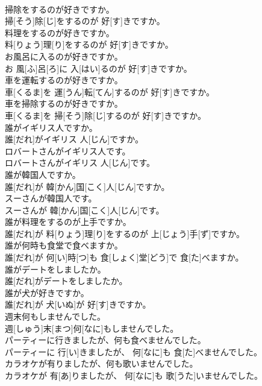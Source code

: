 \documentclass[8pt]{extreport}
\begin{document}
\begin{CJK}{UTF8}{min}
\\	掃除をするのが好きですか。	
\\	掃[そう]除[じ]をするのが 好[す]きですか。
\\	料理をするのが好きですか。	
\\	料[りょう]理[り]をするのが 好[す]きですか。
\\	お風呂に入るのが好きですか。	
\\	お 風[ふ]呂[ろ]に 入[はい]るのが 好[す]きですか。
\\	車を運転するのが好きですか。	
\\	車[くるま]を 運[うん]転[てん]するのが 好[す]きですか。
\\	車を掃除するのが好きですか。	
\\	車[くるま]を 掃[そう]除[じ]するのが 好[す]きですか。
\\	誰がイギリス人ですか。	
\\	誰[だれ]がイギリス 人[じん]ですか。
\\	ロバートさんがイギリス人です。	
\\	ロバートさんがイギリス 人[じん]です。
\\	誰が韓国人ですか。	
\\	誰[だれ]が 韓[かん]国[こく]人[じん]ですか。
\\	スーさんが韓国人です。	
\\	スーさんが 韓[かん]国[こく]人[じん]です。
\\	誰が料理をするのが上手ですか。	
\\	誰[だれ]が 料[りょう]理[り]をするのが 上[じょう]手[ず]ですか。
\\	誰が何時も食堂で食べますか。	
\\	誰[だれ]が 何[い]時[つ]も 食[しょく]堂[どう]で 食[た]べますか。
\\	誰がデートをしましたか。	
\\	誰[だれ]がデートをしましたか。
\\	誰が犬が好きですか。	
\\	誰[だれ]が 犬[いぬ]が 好[す]きですか。
\\	週末何もしませんでした。	
\\	週[しゅう]末[まつ]何[なに]もしませんでした。
\\	パーティーに行きましたが、何も食べませんでした。	
\\	パーティーに 行[い]きましたが、 何[なに]も 食[た]べませんでした。
\\	カラオケが有りましたが、何も歌いませんでした。	
\\	カラオケが 有[あ]りましたが、 何[なに]も 歌[うた]いませんでした。

\end{CJK}
\end{document}
